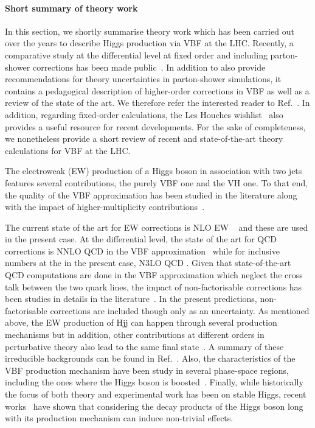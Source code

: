 
\paragraph{Short summary of theory work} In this section, we shortly summarise theory work which has been carried out over the years to describe Higgs production via VBF at the LHC.
Recently, a comparative study at the differential level at fixed order and including parton-shower corrections has been made public~\cite{TOBEADDED}.
In addition to also provide recommendations for theory uncertainties in parton-shower simulations, it contains a pedagogical description of higher-order corrections in VBF as well as a review of the state of the art.
We therefore refer the interested reader to Ref.~\cite{TOBEADDED}.
In addition, regarding fixed-order calculations, the Les Houches wishlist~\cite{LesHouches} also provides a useful resource for recent developments.
For the sake of completeness, we nonetheless provide a short review of recent and state-of-the-art theory calculations for VBF at the LHC.

The electroweak (EW) production of a Higgs boson in association with two jets features several contributions, the purely VBF one and the VH one.
To that end, the quality of the VBF approximation has been studied in the literature along with the impact of higher-multiplicity contributions~\cite{Figy:2003nv,Berger:2004pca,Ciccolini:2007jr,Bolzoni:2011cu,Campanario:2013fsa,Campanario:2018ppz,TOBEADDED}.

The current state of the art for EW corrections is NLO EW ~\cite{Ciccolini:2007jr,Ciccolini:2007ec} and these are used in the present case.
At the differential level, the state of the art for QCD corrections is
NNLO QCD in the VBF approximation~\cite{Cacciari:2015jma,Cruz-Martinez:2018rod} while for inclusive numbers at the in the present case, N3LO QCD \cite{Dreyer:2016oyx}.
Given that state-of-the-art QCD computations are done in the VBF approximation which neglect the cross talk between the two quark lines, the impact of non-factorisable corrections has been studies in details in the literature~\cite{Liu:2019tuy,Dreyer:2020urf,Asteriadis:2023nyl,Bronnum-Hansen:2023vzh,Long:2023mvc,Gates:2023iiv}.
In the present predictions, non-factorisable corrections are included though only as an uncertainty.
As mentioned above, the EW production of Hjj can happen through several production mechanisms but in addition, other contributions at different orders in perturbative theory also lead to the same final state~\cite{Andersen:2006ag,Andersen:2007mp,Harlander:2008xn,Greiner:2016awe,Greiner:2015jha,Andersen:2017kfc,Andersen:2018tnm,Andersen:2018kjg,Chen:2021azt,Andersen:2022zte}.
A summary of these irreducible backgrounds can be found in Ref.~\cite{TOBEADDED}.
Also, the characteristics of the VBF production mechanism have been study in several phase-space regions, including the ones where the Higgs boson is boosted~\cite{Becker:2020rjp,Buckley:2021gfw}.
Finally, while historically the focus of both theory and experimental work has been on stable Higgs, recent works~\cite{Asteriadis:2021gpd,Asteriadis:2024nbg} have shown that considering the decay products of the Higgs boson long with its production mechanism can induce non-trivial effects.

